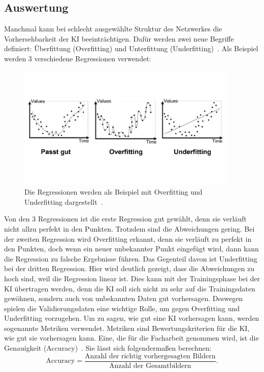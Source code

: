 \documentclass[11pt]{article}
\begin{document}
\subsection{Auswertung}\label{auswertung}
Manchmal kann bei schlecht ausgewählte Struktur des Netzwerkes die Vorhersehbarkeit der KI beeinträchtigen.
Dafür werden zwei neue Begriffe definiert: Überfittung (Overfitting) und Unterfittung (Underfitting)~\cite{7}.
Als Beispiel werden 3 verschiedene Regressionen verwendet:
\begin{figure}[h]
    \centering
    \includegraphics[width=300pt, keepaspectratio]{images/overfitting}
    \caption[Overfitting und Underfitting~\cite{7}]{Die Regressionen werden als Beispiel mit Overfitting und Underfitting dargestellt~\cite{7}.}
\end{figure}
Von den 3 Regressionen ist die erste Regression gut gewählt, denn sie verläuft nicht allzu perfekt in den Punkten. Trotzdem sind die
Abweichungen gering. Bei der zweiten Regression wird Overfitting erkannt, denn sie verläuft zu perfekt in den Punkten, doch wenn
ein neuer unbekannter Punkt eingefügt wird, dann kann die Regression zu falsche Ergebnisse führen. Das Gegenteil davon ist Underfitting
bei der dritten Regression. Hier wird deutlich gezeigt, dass die Abweichungen zu hoch sind, weil die Regression linear ist.
Dies kann mit der Trainingsphase bei der KI übertragen werden, denn die KI soll sich nicht zu sehr auf die Trainingsdaten gewöhnen,
sondern auch von unbekannten Daten gut vorhersagen. Deswegen spielen die Validierungsdaten eine wichtige Rolle, um gegen Overfitting
und Underfitting vorzugehen. Um zu sagen, wie gut eine KI vorhersagen kann, werden sogenannte Metriken verwendet. Metriken sind Bewertungskriterien für die KI,
wie gut sie vorhersagen kann. Eine, die für die Facharbeit genommen wird, ist die Genauigkeit (Accuracy)~\cite{21}. Sie lässt sich folgendermaßen
berechnen:
\begin{equation}
    \text{Accuracy} = \frac{\text{Anzahl der richtig vorhergesagten Bildern}}{\text{Anzahl der Gesamtbildern}}.
\end{equation}
\end{document}
